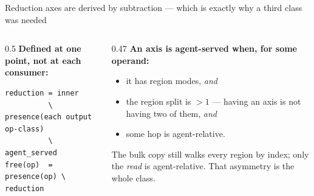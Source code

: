\begin{frame}[fragile]{Reduction axes are derived by subtraction --- which is exactly why a third class was needed}
\begin{center}
\end{center}
\vspace{-2pt}
\begin{columns}[T]
\begin{column}{0.5\textwidth}
\textbf{Defined at one point, not at each consumer:}
\begin{lstlisting}[style=pseudo]
reduction = inner
          \ presence(each output op-class)
          \ agent_served
free(op)  = presence(op) \ reduction
\end{lstlisting}
\end{column}
\begin{column}{0.47\textwidth}
\textbf{An axis is agent-served when, for some operand:}
\begin{itemize}\itemsep0pt
\item it has region modes, \emph{and}
\item the region split is $>1$ --- having an axis is not having two of them, \emph{and}
\item some  hop is agent-relative.
\end{itemize}
\vspace{2pt}
The bulk copy still walks every region by index; only the \emph{read} is agent-relative.
That asymmetry is the whole class.
\end{column}
\end{columns}
\end{frame}
